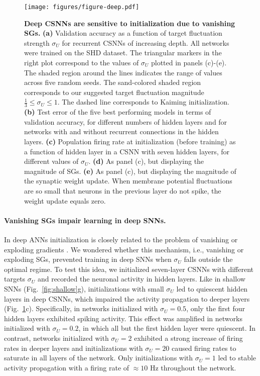 \documentclass[11pt,a4paper]{article}
\begin{document}
\begin{figure}[tb]
    \centering
    \texttt{[image: figures/figure-deep.pdf]}
    \caption{\textbf{Deep \acp{CSNN} are sensitive to initialization due to vanishing \acp{SG}.} 
    \textbf{(a)} Validation accuracy as a function of target fluctuation strength $\sigma_U$ for recurrent \acp{CSNN} of increasing depth. All networks were trained on the SHD dataset. The triangular markers in the right plot correspond to the values of $\sigma_U$ plotted in panels (c)-(e). The shaded region around the lines indicates the range of values across five random seeds. The sand-colored shaded region corresponds to our suggested target fluctuation magnitude $\frac{1}{3} \leq \sigma_U \leq 1$. The dashed line corresponds to Kaiming initialization.
    \textbf{(b)} Test error of the five best performing models in terms of validation accuracy, for different numbers of hidden layers and for networks with and without recurrent connections in the hidden layers.
    \textbf{(c)} Population firing rate at initialization (before training) as a function of hidden layer in a \ac{CSNN} with seven hidden layers, for different values of $\sigma_U$.
    \textbf{(d)} As panel (c), but displaying the magnitude of \acp{SG}. 
    \textbf{(e)} As panel (c), but displaying the magnitude of the synaptic weight update. When membrane potential fluctuations are so small that neurons in the previous layer do not spike, the weight update equals zero.
    }
    \label{fig:deep}
\end{figure}

\paragraph{Vanishing \acp{SG} impair learning in deep \acp{SNN}.}
In deep \acp{ANN} initialization is closely related to the problem of vanishing or exploding gradients \citep{Hochreiter1991-uo,Hochreiter1997-hj}. 
We wondered whether this mechanism, i.e., vanishing or exploding \acp{SG}, prevented training in deep \acp{SNN} when $\sigma_U$ falls outside the optimal regime.
To test this idea, we initialized seven-layer \acp{CSNN} with different targets $\sigma_U$ and recorded the neuronal activity in hidden layers.
Like in shallow \acp{SNN} (Fig.~\ref{fig:shallow}g), initializations with small $\sigma_U$ led to quiescent hidden layers in deep \acp{CSNN}, which impaired the activity propagation to deeper layers (Fig.~\ref{fig:deep}c).
Specifically, in networks initialized with $\sigma_U = 0.5$, only the first four hidden layers exhibited spiking activity.
This effect was amplified in networks initialized with $\sigma_U = 0.2$, in which all but the first hidden layer were quiescent. 
In contrast, networks initialized with $\sigma_U = 2$ exhibited a strong increase of firing rates in deeper layers and initializations with $\sigma_U =20$ caused firing rates to saturate in all layers of the network.
Only initializations with $\sigma_U = 1$ led to stable activity propagation with a firing rate of $\approx10$ Hz throughout the network. 
\end{document}
